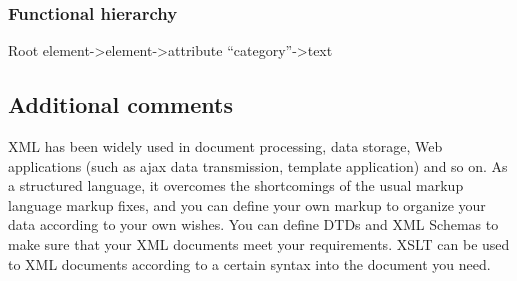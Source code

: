 
\subsubsection{Functional hierarchy}
Root element->element->attribute “category”->text

\subsection{Additional comments}
XML has been widely used in document processing, data storage, Web applications (such as ajax data transmission, template application) and so on. As a structured language, it overcomes the shortcomings of the usual markup language markup fixes, and you can define your own markup to organize your data according to your own wishes. You can define DTDs and XML Schemas to make sure that your XML documents meet your requirements. XSLT can be used to XML documents according to a certain syntax into the document you need.

